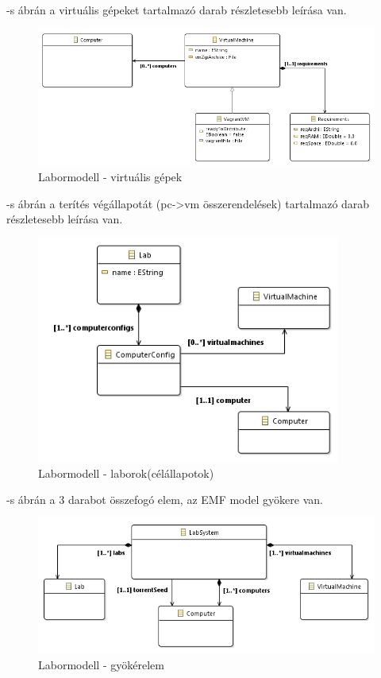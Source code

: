 -s ábrán a virtuális gépeket tartalmazó darab részletesebb leírása van.

\begin{figure}[ht]
	\centering
	\includegraphics[width=130mm, keepaspectratio]{figures/design_vm.png}
	\caption{Labormodell - virtuális gépek}
	\label{fig:designvm}
\end{figure}

-s ábrán a terítés végállapotát (pc->vm összerendelések) tartalmazó darab részletesebb leírása van.

\begin{figure}[h!]
	\centering
	\includegraphics[width=100mm, keepaspectratio]{figures/design_lab.png}
	\caption{Labormodell - laborok(célállapotok)}
	\label{fig:designlab}
\end{figure}

-s ábrán a 3 darabot összefogó elem, az EMF model gyökere van.

\begin{figure}[h!]
	\centering
	\includegraphics[width=130mm, keepaspectratio]{figures/design_modelroot.png}
	\caption{Labormodell - gyökérelem}
	\label{fig:designoverview}
\end{figure}

